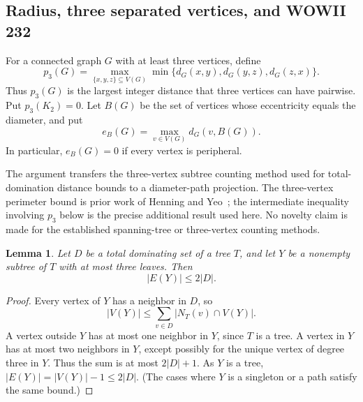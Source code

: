 \documentclass[11pt,a4paper]{article}
\newtheorem{lemma}[theorem]{Lemma}
\theoremstyle{remark}
\begin{document}
\subsection{Radius, three separated vertices, and WOWII 232}
\label{r9:sec232}
For a connected graph $G$ with at least three vertices, define
\[
 p_3(G)=\max_{\{x,y,z\}\subseteq V(G)}
       \min\{d_G(x,y),d_G(y,z),d_G(z,x)\}.
\]
Thus $p_3(G)$ is the largest integer distance that three vertices can
have pairwise. Put $p_3(K_2)=0$. Let $B(G)$ be the set of vertices
whose eccentricity equals the diameter, and put
\[
 e_B(G)=\max_{v\in V(G)}d_G(v,B(G)).
\]
In particular, $e_B(G)=0$ if every vertex is peripheral.

The argument transfers the three-vertex subtree counting method used
for total-domination distance bounds to a diameter-path projection.
The three-vertex perimeter bound is prior work of Henning and
Yeo~\cite{HY14}; the intermediate inequality involving $p_3$ below
is the precise additional result used here. No novelty claim is made
for the established spanning-tree or three-vertex counting methods.

\begin{lemma}\label{r9:lem-subtree-count}
Let $D$ be a total dominating set of a tree $T$, and let $Y$ be a
nonempty subtree of $T$ with at most three leaves. Then
\[
 |E(Y)|\le 2|D|.
\]
\end{lemma}
\begin{proof}
Every vertex of $Y$ has a neighbor in $D$, so
\[
 |V(Y)|\le\sum_{v\in D}|N_T(v)\cap V(Y)|.
\]
A vertex outside $Y$ has at most one neighbor in $Y$, since $T$
is a tree. A vertex in $Y$ has at most two neighbors in $Y$, except
possibly for the unique vertex of degree three in $Y$. Thus the sum
is at most $2|D|+1$. As $Y$ is a tree, $|E(Y)|=|V(Y)|-1\le2|D|$.
(The cases where $Y$ is a singleton or a path satisfy the same bound.)
\end{proof}
\end{document}

